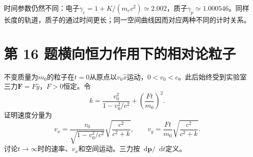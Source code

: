 \documentclass[UTF8,fontset=fandol,a4paper,11pt]{ctexart}
\newcommand{\dd}{\mathop{}\!\mathrm{d}}
\begin{document}
时间参数仍然不同：电子$\gamma_e=1+K/(m_ec^2)\simeq2.002$，质子$\gamma_p\simeq1.000546$。同样长度的轨道，质子的通过时间更长；同一空间曲线因而对应两种不同的计时关系。




\section*{第 16 题\quad 横向恒力作用下的相对论粒子}\label{q:16}

不变质量为$m_0$的粒子在$t=0$从原点以$v_0\hat x$运动，$0<v_0<c$。此后始终受到实验室三力$\boldsymbol F=F\hat y$，$F>0$恒定。令
\[
k=\frac{v_0^2}{1-v_0^2/c^2}+\left(\frac{Ft}{m_0}\right)^2.
\]
证明速度分量为
\[
v_x=\frac{v_0}{\sqrt{1-v_0^2/c^2}}\sqrt{\frac{c^2}{c^2+k}},
\qquad
v_y=\frac{Ft}{m_0}\sqrt{\frac{c^2}{c^2+k}}.
\]
讨论$t\to\infty$时的速率、$v_x$和空间运动。三力按$\dd\boldsymbol p/\dd t$定义。
\end{document}
